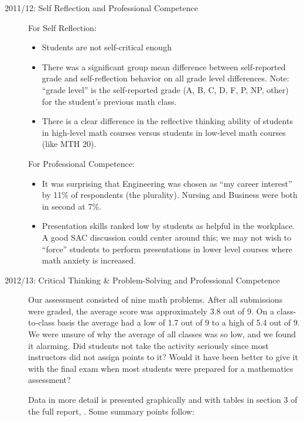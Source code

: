 \begin{description}

\item[2011/12: Self Reflection and Professional Competence]
For Self Reflection: 
\begin{itemize}
\item Students are not self-critical enough
\item There was a significant group mean difference between self-reported grade
  and self-reflection behavior on all grade level differences.  Note: ``grade
  level'' is the self-reported grade (A, B, C, D, F, P, NP, other) for the
  student's previous math class.
\item There is a clear difference in the reflective thinking ability of students
  in high-level math courses versus students in low-level math courses (like MTH
  20).
\end{itemize}
For Professional Competence:
\begin{itemize}
\item It was surprising that Engineering was chosen as ``my career interest'' by
  11\% of respondents (the plurality). Nursing and Business were both in second
  at 7\%.
\item Presentation skills ranked low by students as helpful in the workplace.
  A good SAC discussion could center around this; we may not
  wish to ``force'' students to perform presentations in lower level courses where math
  anxiety is increased.
\end{itemize}

\item[2012/13:  Critical Thinking \& Problem-Solving and Professional Competence]

Our assessment consisted of nine math problems.  After all submissions were
graded, the average score was approximately 3.8 out of 9.  On a class-to-class
basis the average had a low of 1.7 out of 9 to a high of 5.4 out of 9.  We were
unsure of why the average of all classes was so low, and we found it alarming.
Did students not take the activity seriously since most instructors did not
assign points to it?  Would it have been better to give it with the final exam
when most students were prepared for a mathematics assessment? 

Data in more detail is presented graphically and with tables in section 3 of the
full report, \cite{annualLASreport2012}. Some summary points follow:


\end{description}
